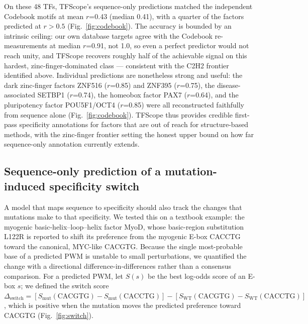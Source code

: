 \documentclass[11pt,letterpaper]{article}
\begin{document}
On these 48 TFs, TFScope's sequence-only predictions matched the independent Codebook
motifs at mean $r$=0.43 (median 0.41), with a quarter of the factors predicted at
$r>0.5$ (Fig.~\ref{fig:codebook}). The accuracy is bounded by an intrinsic ceiling:
our own database targets agree with the Codebook re-measurements at median $r$=0.91,
not 1.0, so even a perfect predictor would not reach unity, and TFScope recovers
roughly half of the achievable signal on this hardest, zinc-finger-dominated class —
consistent with the C2H2 frontier identified above. Individual predictions are
nonetheless strong and useful: the dark zinc-finger factors ZNF516 ($r$=0.85) and
ZNF395 ($r$=0.75), the disease-associated SETBP1 ($r$=0.74), the homeobox factor PAX7
($r$=0.64), and the pluripotency factor POU5F1/OCT4 ($r$=0.85) were all reconstructed
faithfully from sequence alone (Fig.~\ref{fig:codebook}). TFScope thus provides
credible first-pass specificity annotations for factors that are out of reach for
structure-based methods, with the zinc-finger frontier setting the honest upper bound
on how far sequence-only annotation currently extends.

\subsection*{Sequence-only prediction of a mutation-induced specificity switch}

A model that maps sequence to specificity should also track the changes that mutations
make to that specificity. We tested this on a textbook example: the myogenic
basic-helix--loop--helix factor MyoD, whose basic-region substitution L122R is reported
to shift its preference from the myogenic E-box CACCTG toward the canonical, MYC-like
CACGTG. Because the single most-probable base of a predicted PWM is unstable to small
perturbations, we quantified the change with a directional difference-in-differences
rather than a consensus comparison. For a predicted PWM, let $S(s)$ be the best
log-odds score of an E-box $s$; we defined the switch score
$\Delta_{\text{switch}} = [S_{\text{mut}}(\text{CACGTG}) - S_{\text{mut}}(\text{CACCTG})]
- [S_{\text{WT}}(\text{CACGTG}) - S_{\text{WT}}(\text{CACCTG})]$, which is positive when
the mutation moves the predicted preference toward CACGTG (Fig.~\ref{fig:switch}).
\end{document}
